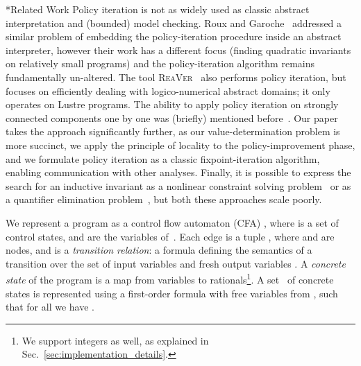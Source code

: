 \documentclass{llncs}
\makeatletter
\newcommand{\cfa}{\textsc{CFA}\xspace}
\renewcommand{\paragraph}{\@startsection{paragraph}{4}{\z@}{0.8ex \@plus 0ex \@minus 1ex}{-1em}{\normalfont\normalsize\bfseries}}
\newlength{\sectionspace}
\renewcommand\section{\@startsection{section}{1}{\z@}{-18\sectionspace \@plus -4\sectionspace \@minus -4\sectionspace}{12\sectionspace \@plus 4\sectionspace \@minus 4\sectionspace}{\normalfont\large\bfseries\boldmath
                        \rightskip=\z@ \@plus 8em\pretolerance=10000 }}
\makeatother
\begin{document}
\paragraph*{Related Work}
Policy iteration is not as widely used as classic abstract interpretation and (bounded) model checking.
Roux and Garoche~\cite{roux_policy_iteration_integration} addressed
a similar problem of embedding the policy-iteration procedure inside an
abstract interpreter, however their work has a different focus (finding
quadratic invariants on relatively small programs)
and the policy-iteration algorithm remains fundamentally un-altered.
The tool \textsc{ReaVer}~\cite{ReaVer} also performs policy iteration, but focuses on
efficiently dealing with logico-numerical abstract domains; it only
operates on Lustre programs.
The ability to apply policy iteration on strongly connected components one
by one was (briefly) mentioned before~\cite{pi_separate_scc}.
Our paper takes the approach significantly further, as our value-determination problem is
more succinct, we apply the principle of
locality to the policy-improvement phase, and we formulate policy iteration as
a classic fixpoint-iteration algorithm, enabling communication with other
analyses.
Finally, it is possible to express the search for an inductive invariant
as a nonlinear constraint solving problem~\cite{direct_invariant_generation} or
as a quantifier elimination problem~\cite{Monniaux_LMCS10}, but both these
approaches scale poorly.

\section{Background}
\label{sec:background}
We represent a program  as a control flow automaton (\cfa)
, where  is a set of control
states, and  are the variables of~.
Each edge   is a tuple , where
 and  are nodes,
and  is a \emph{transition relation}: a formula
defining the semantics of a transition over the set of input variables  and fresh output variables .
A \emph{concrete state} of the program  is a map  from
variables to rationals\footnote{We support integers as well, as explained in Sec.~\ref{sec:implementation_details}.}.
A set~ of concrete states is represented using a first-order formula  with
free variables from , such that for all  we have .
\end{document}
